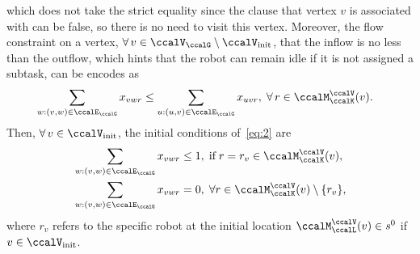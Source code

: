 \documentclass[Afour,sageh,times]{sagej}
\begin{document}
which does not take the strict equality since the clause that vertex $v$ is associated with can be false, so there is no need to visit this vertex. Moreover, the flow constraint on a vertex, $\forall \,v \in \ccalV_\ccalG\setminus\ccalV_{\text{init}}$, that the inflow is no less than the outflow, which hints that the robot can remain idle if it is not assigned a subtask, can be encodes as
 \begingroup\makeatletter\def\f@size{10}\check@mathfonts
\def\maketag@@@#1{\hbox{\m@th\normalsize\normalfont#1}}%
\begin{align}
& \sum_{w:(v,w)\in \ccalE_\ccalG} x_{vwr}   \leq  \sum_{u:(u,v)\in \ccalE_\ccalG} x_{uvr}, \;\forall\, r \in \ccalM^\ccalV_{\ccalK}(v). \label{eq:2}
\end{align}
\endgroup
Then, $\forall \,v \in \ccalV_{\text{init}}$, the initial conditions of~\eqref{eq:2} are
\begingroup\makeatletter\def\f@size{10}\check@mathfonts
\def\maketag@@@#1{\hbox{\m@th\normalsize\normalfont#1}}%
\begin{subequations}\label{eq:2.5}
  \begin{align}
    & \sum_{w:(v,w)\in \ccalE_\ccalG} x_{vwr}  \leq 1, \;\text{if}\; r = r_v \in \ccalM^\ccalV_{\ccalK}(v), \label{eq:2.5a}\\
    & \sum_{w:(v,w)\in \ccalE_\ccalG} x_{vwr}  = 0, \;\forall r \in \ccalM^\ccalV_{\ccalK}(v)\setminus \{ r_v\}, \label{eq:2.5b}
  \end{align}
\end{subequations}
\endgroup
where $r_v$ refers to the specific robot at the initial location $\ccalM^\ccalV_{\ccalL}(v)\in s^0$ if $v \in \ccalV_{\text{init}}$.
\end{document}
